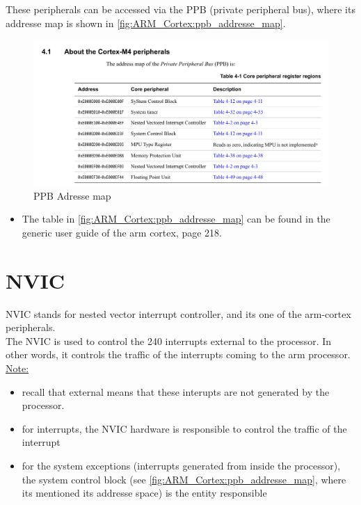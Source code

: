 \newpage
These peripherals can be accessed via the PPB (private peripheral bus), where its addresse map is shown in \autoref{fig:ARM_Cortex:ppb_addresse_map}.

\begin{figure}[h]
\centering
\includegraphics[scale=0.4,frame]{Figures/ARM_Cortex/ppb_addresse_map}
\caption{PPB Adresse map}
\label{fig:ARM_Cortex:ppb_addresse_map}
\end{figure}

\begin{itemize}

\item The table in \autoref{fig:ARM_Cortex:ppb_addresse_map} can be found in the generic user guide of the arm cortex, page 218.

\end{itemize}

\newpage
\section{NVIC}

NVIC stands for nested vector interrupt controller, and its one of the arm-cortex peripherals.\\

The NVIC is used to control the 240 interrupts external to the processor. In other words, it controls the traffic of the interrupts coming to the arm processor.\\

\underline{Note:} 

\begin{itemize}

\item recall that external means that these interupts are not generated by the processor.

\item for interrupts, the NVIC hardware is responsible to control the traffic of the interrupt

\item for the system exceptions (interrupts generated from inside the processor), the system control block (see \autoref{fig:ARM_Cortex:ppb_addresse_map}, where its mentioned its addresse space) is the entity responsible

\end{itemize}


